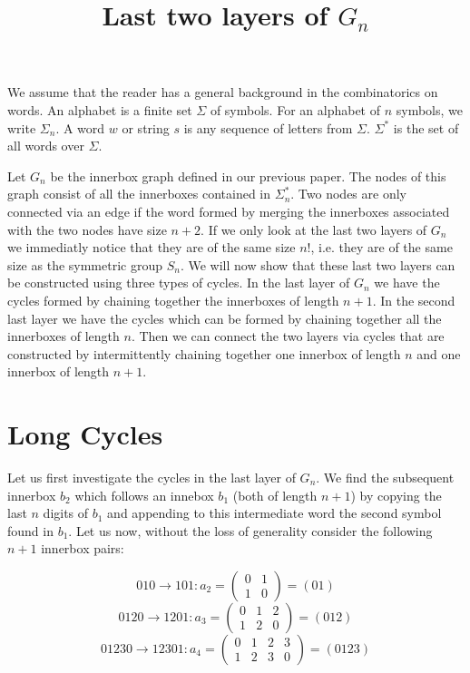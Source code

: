 \documentclass[a4paper,10pt]{article}
\title{Last two layers of $G_n$}
\author{}
\theoremstyle{definition}
\begin{document}
\maketitle


We assume that the reader has a general background in the combinatorics on words. An alphabet is a finite set $\Sigma$ of symbols. For an alphabet of $n$ symbols, we write $\Sigma_n$. A word $w$ or string $s$ is any sequence of letters from $\Sigma$. $\Sigma^{*}$ is the set of all words over $\Sigma$.

Let $G_n$ be the innerbox graph defined in our previous paper. The nodes of this graph consist of all the innerboxes contained in $\Sigma_n^*$. Two nodes are only connected via an edge if the word formed by merging the innerboxes associated with the two nodes have size $n+2$. If we only look at the last two layers of $G_n$ we immediatly notice that they are of the same size $n!$, i.e. they are of the same size as the symmetric group $S_n$. We will now show that these last two layers can be constructed using three types of cycles. In the last layer of $G_n$ we have the cycles formed by chaining together the innerboxes of length $n+1$. In the second last layer we have the cycles which can be formed by chaining together all the innerboxes of length $n$. Then we can connect the two layers via cycles that are constructed by intermittently chaining together one innerbox of length $n$ and one innerbox of length $n+1$.  


\section{Long Cycles}
Let us first investigate the cycles in the last layer of $G_n$. We find the subsequent innerbox $b_2$ which follows an innebox $b_1$ (both of length $n+1$) by copying the last $n$ digits of $b_1$ and appending to this intermediate word the second symbol found in $b_1$.   Let us now, without the loss of generality consider the following $n+1$ innerbox pairs:

\begin{equation}
010\rightarrow101:a_2=\begin{pmatrix}
0&1\\
1&0
\end{pmatrix} = (01)
\end{equation}
\begin{equation}
0120\rightarrow1201:a_3=\begin{pmatrix}
0&1&2\\
1&2&0
\end{pmatrix} = (012)
\end{equation}
\begin{equation}
01230\rightarrow12301:a_4=\begin{pmatrix}
0&1&2&3\\
1&2&3&0
\end{pmatrix} = (0123)
\end{equation}
\end{document}
